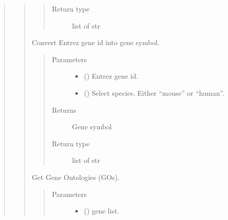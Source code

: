 \documentclass[letterpaper,10pt,english]{sphinxmanual}
\begin{document}
\begin{quote}
\begin{quote}
\begin{fulllineitems}
\begin{quote}
\begin{description}
\item[{Return type}] \leavevmode
list of str

\end{description}\end{quote}

\end{fulllineitems}


\begin{fulllineitems}
\label{\detokenize{modules/celloracle.go_analysis:celloracle.go_analysis.geneID2Symbol}}
Convert Entrez gene id into gene symbol.
\begin{quote}\begin{description}
\item[{Parameters}] \leavevmode\begin{itemize}
\item {} 
 () \textendash{} Entrez gene id.

\item {} 
 () \textendash{} Select species. Either “mouse” or “human”.

\end{itemize}

\item[{Returns}] \leavevmode
Gene symbol

\item[{Return type}] \leavevmode
list of str

\end{description}\end{quote}

\end{fulllineitems}


\begin{fulllineitems}
\label{\detokenize{modules/celloracle.go_analysis:celloracle.go_analysis.get_GO}}
Get Gene Ontologies (GOs).
\begin{quote}\begin{description}
\item[{Parameters}] \leavevmode\begin{itemize}
\item {} 
 () \textendash{} gene list.


\end{itemize}
\end{description}
\end{quote}
\end{fulllineitems}
\end{quote}
\end{quote}
\end{document}
